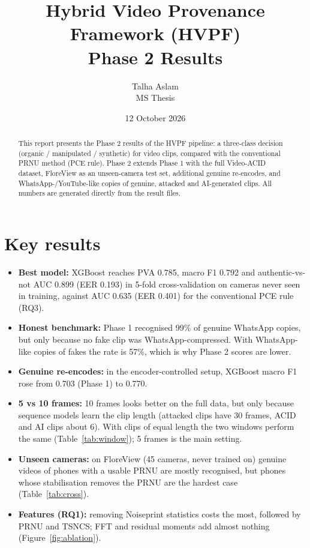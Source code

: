 \documentclass[11pt,a4paper]{article}
\title{\textbf{Hybrid Video Provenance Framework (HVPF)}\\[3pt]\large Phase 2 Results}
\author{Talha Aslam\\ MS Thesis}
\date{12 October 2026}
\begin{document}
\maketitle
\begin{abstract}\noindent
This report presents the Phase 2 results of the HVPF pipeline: a three-class decision
(organic / manipulated / synthetic) for video clips, compared with the conventional PRNU method (PCE rule).
Phase 2 extends Phase 1 with the full Video-ACID dataset, FloreView as an unseen-camera test set,
additional genuine re-encodes, and WhatsApp-/YouTube-like copies of genuine, attacked and AI-generated clips.
All numbers are generated directly from the result files.
\end{abstract}
\section{Key results}\begin{itemize}
\item \textbf{Best model:} XGBoost reaches PVA 0.785, macro F1 0.792 and authentic-vs-not AUC 0.899 (EER 0.193) in 5-fold cross-validation on cameras never seen in training, against AUC 0.635 (EER 0.401) for the conventional PCE rule (RQ3).
\item \textbf{Honest benchmark:} Phase 1 recognised 99\% of genuine WhatsApp copies, but only because no fake clip was WhatsApp-compressed. With WhatsApp-like copies of fakes the rate is 57\%, which is why Phase 2 scores are lower.
\item \textbf{Genuine re-encodes:} in the encoder-controlled setup, XGBoost macro F1 rose from 0.703 (Phase 1) to 0.770.
\item \textbf{5 vs 10 frames:} 10 frames looks better on the full data, but only because sequence models learn the clip length (attacked clips have 30 frames, ACID and AI clips about 6). With clips of equal length the two windows perform the same (Table~\ref{tab:window}); 5 frames is the main setting.
\item \textbf{Unseen cameras:} on FloreView (45 cameras, never trained on) genuine videos of phones with a usable PRNU are mostly recognised, but phones whose stabilisation removes the PRNU are the hardest case (Table~\ref{tab:cross}).
\item \textbf{Features (RQ1):} removing Noiseprint statistics costs the most, followed by PRNU and TSNCS; FFT and residual moments add almost nothing (Figure~\ref{fig:ablation}).
\end{itemize}
\end{document}

